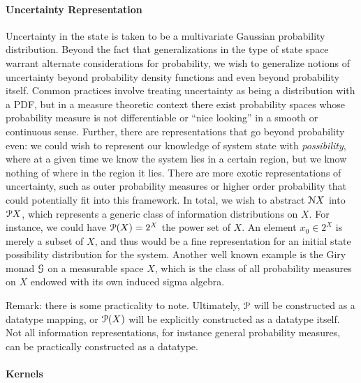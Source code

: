 \paragraph{Uncertainty Representation}

Uncertainty in the state is taken to be a multivariate Gaussian probability distribution. Beyond the fact that generalizations in the type of state space warrant alternate considerations for probability, we wish to generalize notions of uncertainty beyond probability density functions and even beyond probability itself. Common practices involve treating uncertainty as being a distribution with a PDF, but in a measure theoretic context there exist probability spaces whose probability measure is not differentiable or ``nice looking'' in a smooth or continuous sense. Further, there are representations that go beyond probability even: we could wish to represent our knowledge of system state with \emph{possibility}, where at a given time we know the system lies in a certain region, but we know nothing of where in the region it lies. There are more exotic representations of uncertainty, such as outer probability measures \cite{houssineau} or higher order probability \cite{some moriba paper} that could potentially fit into this framework. In total, we wish to abstract $\mathcal{N} X$ into $\mathcal{P} X$, which represents a generic class of information distributions on $X$. For instance, we could have $\mathcal{P}(X) = 2^X$ the power set of $X$. An element $x_0\in 2^X$ is merely a subset of $X$, and thus would be a fine representation for an initial state possibility distribution for the system. Another well known example is the Giry monad $\mathcal{G}$ on a measurable space $X$, which is the class of all probability measures on $X$ endowed with its own induced sigma algebra.

Remark: there is some practicality to note. Ultimately, $\mathcal{P}$ will be constructed as a datatype mapping, or $\mathcal{P}(X)$ will be explicitly constructed as a datatype itself. Not all information representations, for instance general probability measures, can be practically constructed as a datatype.

\paragraph{Kernels}


